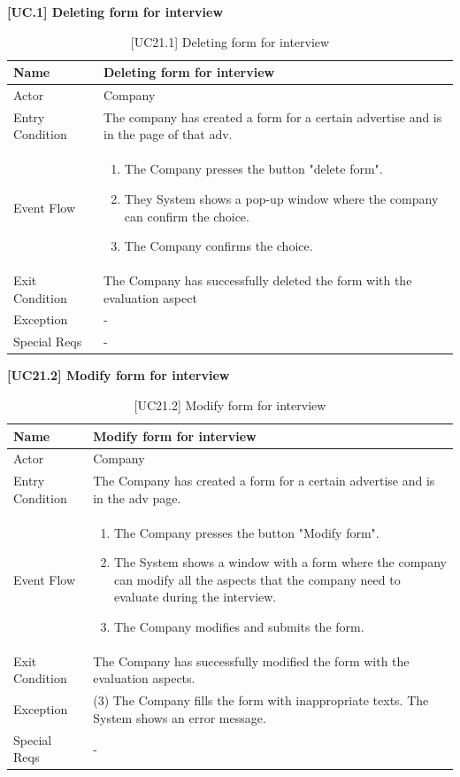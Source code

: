 \textbf{[UC\nextUseCases.1] Deleting form for interview}
\begin{table}[H] %
    \centering
    \begin{tabular}{|p{3cm}|p{10cm}|}
    \hline
    Name & Deleting form for interview \\ \hline
    Actor  & Company \\ \hline
    Entry Condition  & The company has created a form for a certain advertise and is in the page of that adv. \\ \hline
    Event Flow  & 
    \begin{enumerate}[noitemsep, topsep=0pt]
        \item The Company presses the button "delete form".
        \item They System shows a pop-up window where the company can confirm the choice.
        \item The Company confirms the choice.
    \end{enumerate}
    \\ \hline
    Exit Condition  & The Company has successfully deleted the form with the evaluation aspect \\ \hline
    Exception  & - \\ \hline
    Special Reqs  & - \\ \hline
    \end{tabular}
    \caption{[UC21.1] Deleting form for interview}
\end{table}

\textbf{[UC21.2] Modify form for interview}
\begin{table}[H] %
    \centering
    \begin{tabular}{|p{3cm}|p{10cm}|}
    \hline
    Name & Modify form for interview \\ \hline
    Actor  & Company \\ \hline
    Entry Condition  & The Company has created a form for a certain advertise and is in the adv page. \\ \hline
    Event Flow  & 
    \begin{enumerate}[noitemsep, topsep=0pt]
        \item The Company presses the button "Modify form".
        \item The System shows a window with a form where the company can modify all the aspects that the company need to evaluate during the interview.
        \item The Company modifies and submits the form.
    \end{enumerate}
    \\ \hline
    Exit Condition  & The Company has successfully modified the form with the evaluation aspects. \\ \hline
    Exception  & (3) The Company fills the form with inappropriate texts. The System shows an error message. \\ \hline
    Special Reqs  & - \\ \hline
    \end{tabular}
    \caption{[UC21.2] Modify form for interview}
\end{table}

